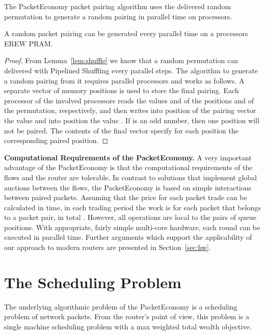 \documentclass[letterpaper,10pt]{llncs}
\newcommand{\hla}[1]{\hl{#1}}
\renewcommand{\hla}[1]{#1}
\begin{document}
\noindent
The PacketEconomy packet pairing algorithm uses the delivered random permutation 
to generate a random pairing in  parallel time on  processors.

\begin{theorem}
\label{the:pairing}
A random packet pairing can be generated every  parallel time on a  processors EREW PRAM.
\end{theorem}

\begin{proof}
\hla{
From Lemma~\ref{lem:shuffle} we know that a random permutation can delivered 
with Pipelined Shuffling every  parallel steps.
The algorithm to generate a random pairing from it
requires  parallel processors and works as follows.
A separate vector of  memory positions is used to store the final pairing.
Each processor  of the involved processors reads the values  and 
of the positions  and  of the permutation, respectively, and then writes into position 
 of the pairing vector the value  and into position 
 the value . If  is an odd number, then one position will not be paired. 
The contents of the final vector specify for each position the corresponding paired position.}
\end{proof}

\noindent
{\bf Computational Requirements of the PacketEconomy.}
A very important advantage of the PacketEconomy is that the computational
requirements of the flows and the router are tolerable.
In contrast to solutions that implement global auctions between the flows,
the PacketEconomy is based on simple interactions between paired packets.
Assuming that the price for each packet trade can be calculated in  time, 
in each trading period the work is  for each packet 
that belongs to a packet pair, in total .
However, all operations are local to the pairs of queue positions.
With appropriate, fairly simple multi-core hardware, each round can be 
executed in  parallel time. Further arguments which support the 
applicability of our approach to modern routers are presented in 
Section~\ref{sec:hw}.

\section{The Scheduling Problem}
\label{sec:sched}

The underlying algorithmic problem of the PacketEconomy is a scheduling problem of network packets.
From the router's point of view, this problem is a single machine scheduling problem with a max 
weighted total wealth objective.
\end{document}

